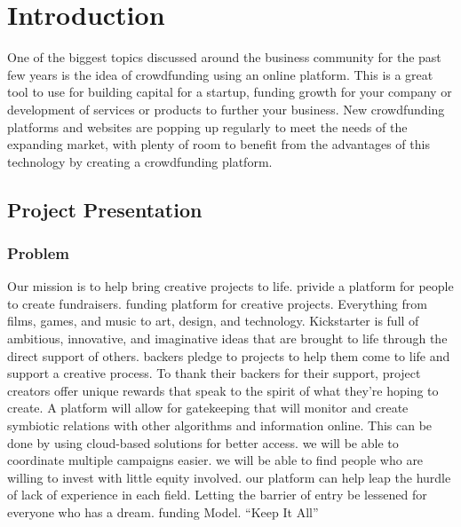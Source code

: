 

\chapter*{Introduction}
\label{chap:general_intorduction}
%
%

One of the biggest topics discussed around the business community for the past few years is the idea of crowdfunding using an online platform. This is a great tool to use for building capital for a startup, funding growth for your company or development of services or products to further your business.
New crowdfunding platforms and websites are popping up regularly to meet the needs of the expanding market, with plenty of room to benefit from the advantages of this technology by creating a crowdfunding platform.

\section*{ Project Presentation }
\subsection*{Problem}
Our mission is to help bring creative projects to life.
privide a platform for people to create fundraisers.
funding platform for creative projects. Everything from films, games, and music to art, design, and technology. Kickstarter is full of ambitious, innovative, and imaginative ideas that are brought to life through the direct support of others.
backers pledge to projects to help them come to life and support a creative process. To thank their backers for their support, project creators offer unique rewards that speak to the spirit of what they're hoping to create.
A platform will allow for gatekeeping that will monitor and create symbiotic relations with other algorithms and information online. This can be done by using cloud-based solutions for better access.
we will be able to coordinate multiple campaigns easier.
we will be able to find people who are willing to invest with little equity involved.
our platform can help leap the hurdle of lack of experience in each field. Letting the barrier of entry be lessened for everyone who has a dream.
funding Model.
“Keep It All”
